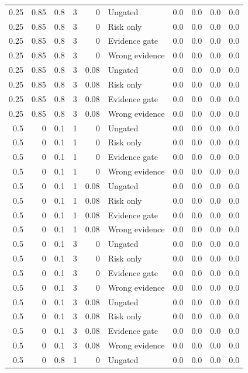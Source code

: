 \begin{longtable}{rrrrrlrrrr}
0.25 & 0.85 & 0.8 & 3 & 0 & Ungated & 0.0 & 0.0 & 0.0 & 0.0\\
0.25 & 0.85 & 0.8 & 3 & 0 & Risk only & 0.0 & 0.0 & 0.0 & 0.0\\
0.25 & 0.85 & 0.8 & 3 & 0 & Evidence gate & 0.0 & 0.0 & 0.0 & 0.0\\
0.25 & 0.85 & 0.8 & 3 & 0 & Wrong evidence & 0.0 & 0.0 & 0.0 & 0.0\\
0.25 & 0.85 & 0.8 & 3 & 0.08 & Ungated & 0.0 & 0.0 & 0.0 & 0.0\\
0.25 & 0.85 & 0.8 & 3 & 0.08 & Risk only & 0.0 & 0.0 & 0.0 & 0.0\\
0.25 & 0.85 & 0.8 & 3 & 0.08 & Evidence gate & 0.0 & 0.0 & 0.0 & 0.0\\
0.25 & 0.85 & 0.8 & 3 & 0.08 & Wrong evidence & 0.0 & 0.0 & 0.0 & 0.0\\
0.5 & 0 & 0.1 & 1 & 0 & Ungated & 0.0 & 0.0 & 0.0 & 0.0\\
0.5 & 0 & 0.1 & 1 & 0 & Risk only & 0.0 & 0.0 & 0.0 & 0.0\\
0.5 & 0 & 0.1 & 1 & 0 & Evidence gate & 0.0 & 0.0 & 0.0 & 0.0\\
0.5 & 0 & 0.1 & 1 & 0 & Wrong evidence & 0.0 & 0.0 & 0.0 & 0.0\\
0.5 & 0 & 0.1 & 1 & 0.08 & Ungated & 0.0 & 0.0 & 0.0 & 0.0\\
0.5 & 0 & 0.1 & 1 & 0.08 & Risk only & 0.0 & 0.0 & 0.0 & 0.0\\
0.5 & 0 & 0.1 & 1 & 0.08 & Evidence gate & 0.0 & 0.0 & 0.0 & 0.0\\
0.5 & 0 & 0.1 & 1 & 0.08 & Wrong evidence & 0.0 & 0.0 & 0.0 & 0.0\\
0.5 & 0 & 0.1 & 3 & 0 & Ungated & 0.0 & 0.0 & 0.0 & 0.0\\
0.5 & 0 & 0.1 & 3 & 0 & Risk only & 0.0 & 0.0 & 0.0 & 0.0\\
0.5 & 0 & 0.1 & 3 & 0 & Evidence gate & 0.0 & 0.0 & 0.0 & 0.0\\
0.5 & 0 & 0.1 & 3 & 0 & Wrong evidence & 0.0 & 0.0 & 0.0 & 0.0\\
0.5 & 0 & 0.1 & 3 & 0.08 & Ungated & 0.0 & 0.0 & 0.0 & 0.0\\
0.5 & 0 & 0.1 & 3 & 0.08 & Risk only & 0.0 & 0.0 & 0.0 & 0.0\\
0.5 & 0 & 0.1 & 3 & 0.08 & Evidence gate & 0.0 & 0.0 & 0.0 & 0.0\\
0.5 & 0 & 0.1 & 3 & 0.08 & Wrong evidence & 0.0 & 0.0 & 0.0 & 0.0\\
0.5 & 0 & 0.8 & 1 & 0 & Ungated & 0.0 & 0.0 & 0.0 & 0.0\\

\end{longtable}
